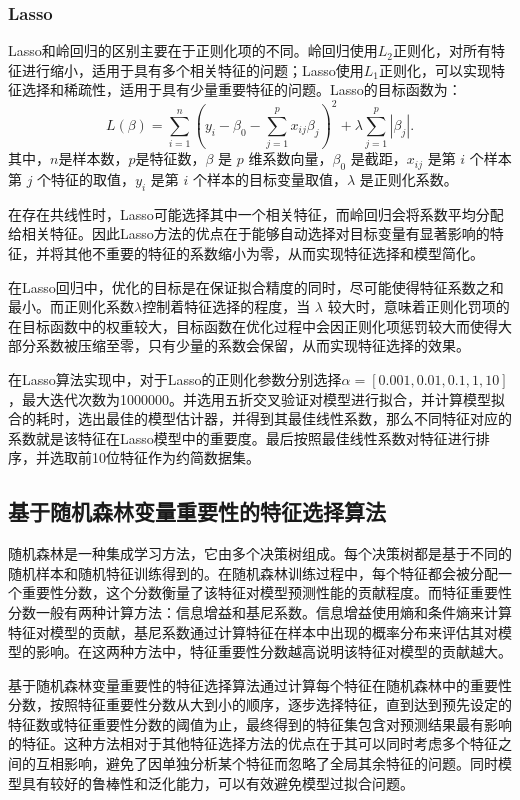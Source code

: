 \subsubsection{Lasso}
Lasso和岭回归的区别主要在于正则化项的不同。岭回归使用$L_2$正则化，对所有特征进行缩小，适用于具有多个相关特征的问题；Lasso使用$L_1$正则化，可以实现特征选择和稀疏性，适用于具有少量重要特征的问题。Lasso的目标函数为：
$$L(\beta)=\sum_{i=1}^{n}\left(y_{i}-\beta_{0}-\sum_{j=1}^{p} x_{i j} \beta_{j}\right)^{2}+\lambda \sum_{j=1}^{p}\left|\beta_{j}\right|.$$
其中，$n$是样本数，$p$是特征数，$\beta$ 是 $p$ 维系数向量，$\beta_0$ 是截距，$x_{ij}$ 是第 $i$ 个样本第 $j$ 个特征的取值，$y_i$ 是第 $i$ 个样本的目标变量取值，$\lambda$ 是正则化系数。

在存在共线性时，Lasso可能选择其中一个相关特征，而岭回归会将系数平均分配给相关特征。因此Lasso方法的优点在于能够自动选择对目标变量有显著影响的特征，并将其他不重要的特征的系数缩小为零，从而实现特征选择和模型简化。

在Lasso回归中，优化的目标是在保证拟合精度的同时，尽可能使得特征系数之和最小。而正则化系数$\lambda$控制着特征选择的程度，当 $\lambda$ 较大时，意味着正则化罚项的在目标函数中的权重较大，目标函数在优化过程中会因正则化项惩罚较大而使得大部分系数被压缩至零，只有少量的系数会保留，从而实现特征选择的效果\cite{基于Lasso的我国股票价格影响因素分析}。

在Lasso算法实现中，对于Lasso的正则化参数分别选择$\alpha=[0.001, 0.01, 0.1, 1, 10]$，最大迭代次数为1000000。并选用五折交叉验证对模型进行拟合，并计算模型拟合的耗时，选出最佳的模型估计器，并得到其最佳线性系数，那么不同特征对应的系数就是该特征在Lasso模型中的重要度。最后按照最佳线性系数对特征进行排序，并选取前10位特征作为约简数据集。

\subsection{基于随机森林变量重要性的特征选择算法}
随机森林是一种集成学习方法，它由多个决策树组成。每个决策树都是基于不同的随机样本和随机特征训练得到的。在随机森林训练过程中，每个特征都会被分配一个重要性分数，这个分数衡量了该特征对模型预测性能的贡献程度。而特征重要性分数一般有两种计算方法：信息增益和基尼系数。信息增益使用熵和条件熵来计算特征对模型的贡献，基尼系数通过计算特征在样本中出现的概率分布来评估其对模型的影响。在这两种方法中，特征重要性分数越高说明该特征对模型的贡献越大。

基于随机森林变量重要性的特征选择算法通过计算每个特征在随机森林中的重要性分数，按照特征重要性分数从大到小的顺序，逐步选择特征，直到达到预先设定的特征数或特征重要性分数的阈值为止，最终得到的特征集包含对预测结果最有影响的特征。这种方法相对于其他特征选择方法的优点在于其可以同时考虑多个特征之间的互相影响，避免了因单独分析某个特征而忽略了全局其余特征的问题。同时模型具有较好的鲁棒性和泛化能力，可以有效避免模型过拟合问题。
